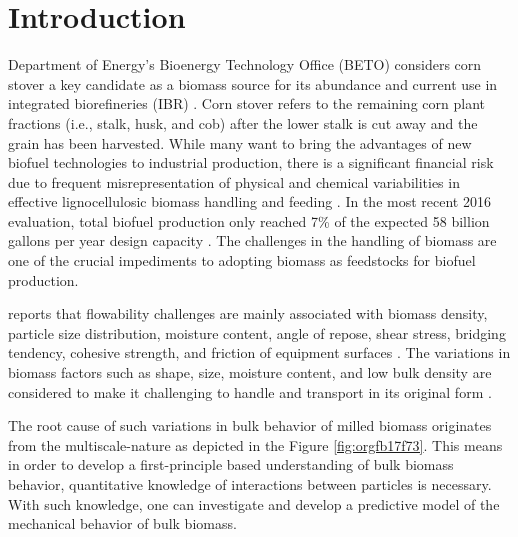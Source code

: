 \documentclass[xcolor=dvipsnames,10pt,hidelinks]{article}
\begin{document}
\section{Introduction}
\label{sec:org8927087}
Department of Energy's Bioenergy Technology Office (BETO) considers corn stover a key candidate as a biomass source for its abundance and current use in integrated biorefineries (IBR) \citep{doyle_integrated_2014,usdoe_u.s._2011,langholtz_2016_2016,perlack_us_2011}. Corn stover refers to the remaining corn plant fractions (i.e., stalk, husk, and cob) after the lower stalk is cut away and the grain has been harvested.
While many want to bring the advantages of new biofuel technologies to industrial production, there is a significant financial risk due to frequent misrepresentation of physical and chemical variabilities in effective lignocellulosic biomass handling and feeding \citep{crawford_effects_2016,ray_multiscale_2020,Ray_BiomassBlendingDensification_2017}.
In the most recent 2016 evaluation, total biofuel production only reached 7\% of the expected 58 billion gallons per year design capacity \citep{westover_biomass_2018}.
The challenges in the handling of biomass are one of the crucial impediments to adopting biomass as feedstocks for biofuel production.

\citet{beto_biorefinery_2016} reports that flowability challenges are mainly associated with biomass density, particle size distribution, moisture content, angle of repose, shear stress, bridging tendency, cohesive strength, and friction of equipment surfaces \citep{westover_biomass_2018}.
The variations in biomass factors such as shape, size, moisture content, and low bulk density are considered to make it challenging to handle and transport in its original form \citep{kaliyan_roll_2009}.

The root cause of such variations in bulk behavior of milled biomass originates from the multiscale-nature as depicted in the Figure \ref{fig:orgfb17f73}.
This means in order to develop a first-principle based understanding of bulk biomass behavior, quantitative knowledge of interactions between particles is necessary.
With such knowledge, one can investigate and develop a predictive model of the mechanical behavior of bulk biomass.
\end{document}
